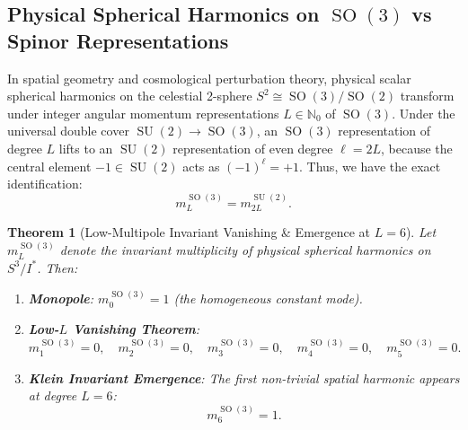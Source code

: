 \documentclass[11pt,a4paper]{article}
\newtheorem{theorem}{Theorem}[section]
\theoremstyle{definition}
\DeclareMathOperator{\SU}{SU}
\DeclareMathOperator{\SO}{SO}
\begin{document}
\subsection{Physical Spherical Harmonics on $\SO(3)$ vs Spinor Representations}
In spatial geometry and cosmological perturbation theory, physical scalar spherical harmonics on the celestial 2-sphere $S^2 \cong \SO(3)/\SO(2)$ transform under integer angular momentum representations $L \in \mathbb{N}_0$ of $\SO(3)$. Under the universal double cover $\SU(2) \to \SO(3)$, an $\SO(3)$ representation of degree $L$ lifts to an $\SU(2)$ representation of even degree $\ell = 2L$, because the central element $-1 \in \SU(2)$ acts as $(-1)^\ell = +1$. Thus, we have the exact identification:
\begin{equation}
m_L^{\SO(3)} = m_{2L}^{\SU(2)}.
\end{equation}

\begin{theorem}[Low-Multipole Invariant Vanishing \& Emergence at $L=6$]
Let $m_L^{\SO(3)}$ denote the invariant multiplicity of physical spherical harmonics on $S^3 / I^*$. Then:
\begin{enumerate}
\item \textbf{Monopole}: $m_0^{\SO(3)} = 1$ (the homogeneous constant mode).
\item \textbf{Low-$L$ Vanishing Theorem}:
\begin{equation}
m_1^{\SO(3)} = 0, \quad m_2^{\SO(3)} = 0, \quad m_3^{\SO(3)} = 0, \quad m_4^{\SO(3)} = 0, \quad m_5^{\SO(3)} = 0.
\end{equation}
\item \textbf{Klein Invariant Emergence}: The first non-trivial spatial harmonic appears at degree $L = 6$:
\begin{equation}
m_6^{\SO(3)} = 1.
\end{equation}
\end{enumerate}
\end{theorem}
\end{document}
